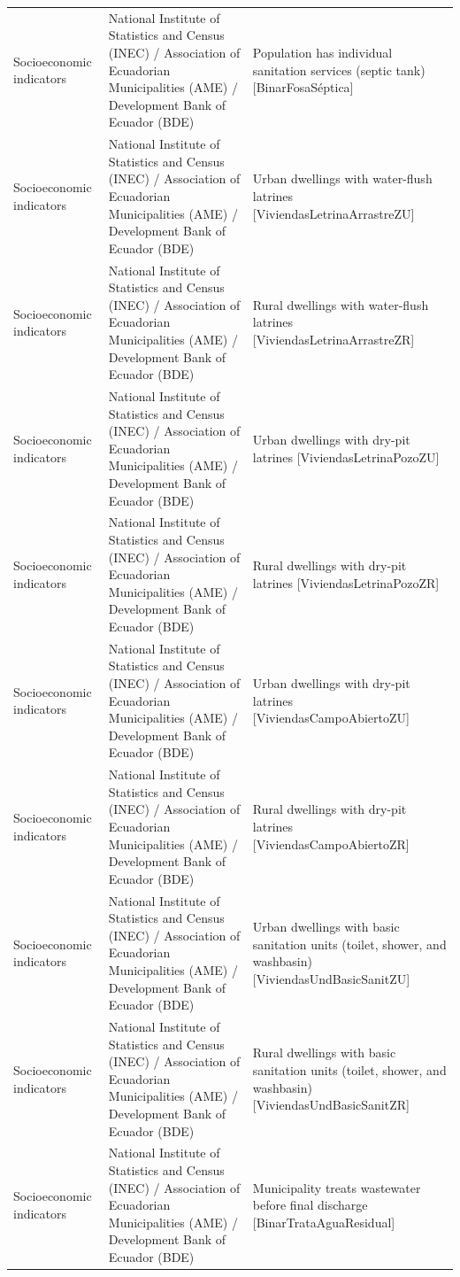 \documentclass[10pt,a4paper]{article}
\begin{document}
\begin{longtable}{@{}>{\raggedright\arraybackslash}p{3.5cm}>{\raggedright\arraybackslash}p{5.6cm}>{\raggedright\arraybackslash}p{\dimexpr\textwidth-9.1cm-4\tabcolsep\relax}@{}}
Socioeconomic indicators & National Institute of Statistics and Census (INEC) / Association of Ecuadorian Municipalities (AME) / Development Bank of Ecuador (BDE) & Population has individual sanitation services (septic tank) [BinarFosaS\'{e}ptica]\\
Socioeconomic indicators & National Institute of Statistics and Census (INEC) / Association of Ecuadorian Municipalities (AME) / Development Bank of Ecuador (BDE) & Urban dwellings with water-flush latrines [ViviendasLetrinaArrastreZU]\\
Socioeconomic indicators & National Institute of Statistics and Census (INEC) / Association of Ecuadorian Municipalities (AME) / Development Bank of Ecuador (BDE) & Rural dwellings with water-flush latrines [ViviendasLetrinaArrastreZR]\\
Socioeconomic indicators & National Institute of Statistics and Census (INEC) / Association of Ecuadorian Municipalities (AME) / Development Bank of Ecuador (BDE) & Urban dwellings with dry-pit latrines [ViviendasLetrinaPozoZU]\\
Socioeconomic indicators & National Institute of Statistics and Census (INEC) / Association of Ecuadorian Municipalities (AME) / Development Bank of Ecuador (BDE) & Rural dwellings with dry-pit latrines [ViviendasLetrinaPozoZR]\\
Socioeconomic indicators & National Institute of Statistics and Census (INEC) / Association of Ecuadorian Municipalities (AME) / Development Bank of Ecuador (BDE) & Urban dwellings with dry-pit latrines [ViviendasCampoAbiertoZU]\\
Socioeconomic indicators & National Institute of Statistics and Census (INEC) / Association of Ecuadorian Municipalities (AME) / Development Bank of Ecuador (BDE) & Rural dwellings with dry-pit latrines [ViviendasCampoAbiertoZR]\\
Socioeconomic indicators & National Institute of Statistics and Census (INEC) / Association of Ecuadorian Municipalities (AME) / Development Bank of Ecuador (BDE) & Urban dwellings with basic sanitation units (toilet, shower, and washbasin) [ViviendasUndBasicSanitZU]\\
Socioeconomic indicators & National Institute of Statistics and Census (INEC) / Association of Ecuadorian Municipalities (AME) / Development Bank of Ecuador (BDE) & Rural dwellings with basic sanitation units (toilet, shower, and washbasin) [ViviendasUndBasicSanitZR]\\
Socioeconomic indicators & National Institute of Statistics and Census (INEC) / Association of Ecuadorian Municipalities (AME) / Development Bank of Ecuador (BDE) & Municipality treats wastewater before final discharge [BinarTrataAguaResidual]\\

\end{longtable}
\end{document}
